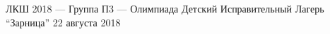 \documentclass [11pt, a4paper, oneside] {article}
\begin{document}
\contest
{ЛКШ 2018 --- Группа П3 --- Олимпиада}%
{Детский Исправительный Лагерь ``Зарница''}%
{22 августа 2018}%


\renewcommand{\t}{\texttt}
\end{document}
